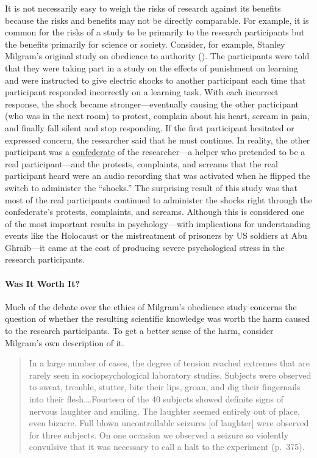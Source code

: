 \documentclass[
]{krantz}
\begin{document}
It is not necessarily easy to weigh the risks of research against its benefits because the risks and benefits may not be directly comparable. For example, it is common for the risks of a study to be primarily to the research participants but the benefits primarily for science or society. Consider, for example, Stanley Milgram's original study on obedience to authority (). The participants were told that they were taking part in a study on the effects of punishment on learning and were instructed to give electric shocks to another participant each time that participant responded incorrectly on a learning task. With each incorrect response, the shock became stronger---eventually causing the other participant (who was in the next room) to protest, complain about his heart, scream in pain, and finally fall silent and stop responding. If the first participant hesitated or expressed concern, the researcher said that he must continue. In reality, the other participant was a \hyperref[confederate]{confederate} of the researcher---a helper who pretended to be a real participant---and the protests, complaints, and screams that the real participant heard were an audio recording that was activated when he flipped the switch to administer the ``shocks.'' The surprising result of this study was that most of the real participants continued to administer the shocks right through the confederate's protests, complaints, and screams. Although this is considered one of the most important results in psychology---with implications for understanding events like the Holocaust or the mistreatment of prisoners by US soldiers at Abu Ghraib---it came at the cost of producing severe psychological stress in the research participants.

\paragraph*{Was It Worth It?}\label{was-it-worth-it}

Much of the debate over the ethics of Milgram's obedience study concerns the question of whether the resulting scientific knowledge was worth the harm caused to the research participants. To get a better sense of the harm, consider Milgram's own description of it.

\begin{quote}
In a large number of cases, the degree of tension reached extremes that are rarely seen in sociopsychological laboratory studies. Subjects were observed to sweat, tremble, stutter, bite their lips, groan, and dig their fingernails into their flesh.\ldots Fourteen of the 40 subjects showed definite signs of nervous laughter and smiling. The laughter seemed entirely out of place, even bizarre. Full blown uncontrollable seizures {[}of laughter{]} were observed for three subjects. On one occasion we observed a seizure so violently convulsive that it was necessary to call a halt to the experiment (p.~375).
\end{quote}
\end{document}
